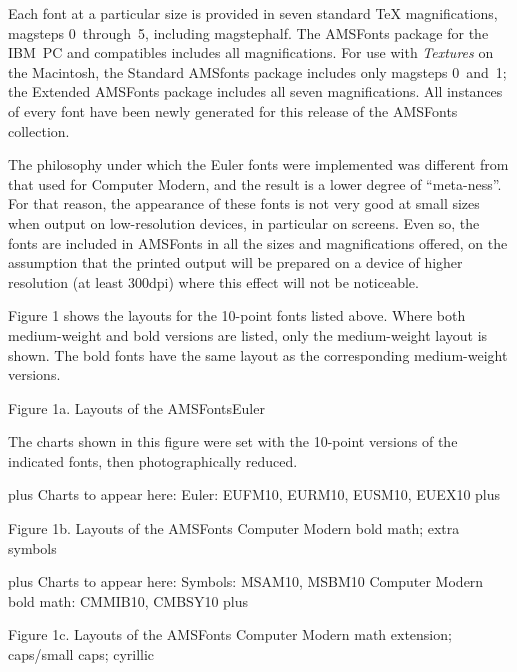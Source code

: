 \noindent
Each font at a particular size is provided in seven standard \TeX{}
magnifications, magsteps 0~through~5, including magstephalf.  The AMSFonts
package for the IBM~PC and compatibles includes all magnifications.  For
use with {\it Textures\/} on the Macintosh, the Standard AMSfonts package
includes only magsteps 0~and~1; the Extended AMSFonts package includes all
seven magnifications.  All instances of every font have been newly
generated for this release of the AMSFonts collection.

The philosophy under which the Euler fonts were implemented was different
from that used for Computer Modern, and the result is a lower degree of
``meta-ness''.  For that reason, the appearance of these fonts is not
very good at small sizes when output on low-resolution devices, in
particular on screens.  Even so, the fonts are included in AMSFonts in all
the sizes and magnifications offered, on the assumption that the printed
output will be prepared on a device of higher resolution (at least 300dpi)
where this effect will not be noticeable.

Figure 1 shows the layouts for the 10-point fonts listed above.
Where both medium-weight and bold versions are listed, only the medium-weight
layout is shown.  The bold fonts have the same layout as the corresponding
medium-weight versions.



\newpage
\normalbottom

\figuretitle Figure 1a. {\rm Layouts of the AMSFonts\Dash Euler}

\Note  The charts shown in this figure were set with the 10-point versions
  of the indicated fonts, then photographically reduced. 
\endx

\vskip 0pt plus \vsize
\begingroup
\leftskip 1in
\obeylines
  Charts to appear here:
  Euler: EUFM10, EURM10, EUSM10, EUEX10
\endgroup
\vskip 0pt plus \vsize
\DoHrule
\eject

\figuretitle Figure 1b. {\rm Layouts of the AMSFonts\Dash
    Computer Modern bold math; extra symbols}

\vskip 0pt plus \vsize
\begingroup
\leftskip 1in
\obeylines
  Charts to appear here:
  Symbols: MSAM10, MSBM10
  Computer Modern bold math: CMMIB10, CMBSY10
\endgroup
\vskip 0pt plus \vsize
\DoHrule
\eject

\figuretitle Figure 1c. {\rm Layouts of the AMSFonts\Dash 
    Computer Modern math extension; caps/small caps; cyrillic}

